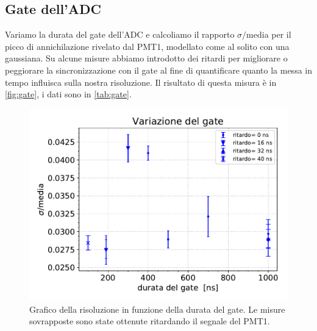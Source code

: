 \subsection{Gate dell'ADC}

Variamo la durata del gate dell'ADC e calcoliamo il rapporto $\sigma\!/$\!media per il picco di annichilazione rivelato dal PMT1, modellato come al solito con una gaussiana.
Su alcune misure abbiamo introdotto dei ritardi per migliorare o peggiorare la sincronizzazione con il gate al fine di quantificare quanto la messa in tempo influisca sulla nostra risoluzione. Il risultato di questa misura è in \autoref{fig:gate}, i dati sono in \autoref{tab:gate}.

\begin{figure}[h]
\centering
\includegraphics[width=20 em]{immagini/gate}
\caption{Grafico della risoluzione in funzione della durata del gate. Le misure sovrapposte sono state ottenute ritardando il segnale del PMT1.}
\label{fig:gate}
\end{figure}

